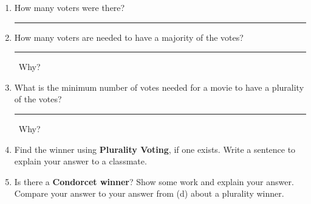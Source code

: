 \documentclass[12pt]{article}
\newcommand{\ans}[1][1in]{\rule{#1}{.5pt}}
\begin{document}
\begin{enumerate}
\begin{enumerate}
\item How many voters were there? \ans
\item How many voters are needed  to have a majority of the votes? \ans\ Why?
\vspace{1 cm}
\item What is the minimum number of votes needed for a movie to have a plurality of the votes? \ans\ Why?
\vspace{1 cm}
\item Find the winner using  {\bf Plurality Voting}, if one exists. Write a sentence to explain your answer to a classmate.
\vspace{1 cm}
  



\item Is there a {\bf Condorcet winner}? Show some work and explain your answer. Compare your answer to your answer from (d) about a plurality winner.

\vfill

\vfill

\vfill

\end{enumerate}

\end{enumerate}
\end{document}

